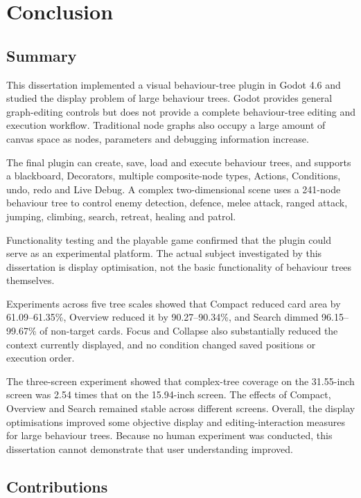 \chapter{Conclusion}
\label{ch:conclusion}

\section{Summary}

This dissertation implemented a visual behaviour-tree plugin in Godot 4.6 and studied the display problem of large behaviour trees. Godot provides general graph-editing controls but does not provide a complete behaviour-tree editing and execution workflow. Traditional node graphs also occupy a large amount of canvas space as nodes, parameters and debugging information increase.

The final plugin can create, save, load and execute behaviour trees, and supports a blackboard, Decorators, multiple composite-node types, Actions, Conditions, undo, redo and Live Debug. A complex two-dimensional scene uses a 241-node behaviour tree to control enemy detection, defence, melee attack, ranged attack, jumping, climbing, search, retreat, healing and patrol.

Functionality testing and the playable game confirmed that the plugin could serve as an experimental platform. The actual subject investigated by this dissertation is display optimisation, not the basic functionality of behaviour trees themselves.

Experiments across five tree scales showed that Compact reduced card area by 61.09--61.35\%, Overview reduced it by 90.27--90.34\%, and Search dimmed 96.15--99.67\% of non-target cards. Focus and Collapse also substantially reduced the context currently displayed, and no condition changed saved positions or execution order.

The three-screen experiment showed that complex-tree coverage on the 31.55-inch screen was 2.54 times that on the 15.94-inch screen. The effects of Compact, Overview and Search remained stable across different screens. Overall, the display optimisations improved some objective display and editing-interaction measures for large behaviour trees. Because no human experiment was conducted, this dissertation cannot demonstrate that user understanding improved.

\section{Contributions}


